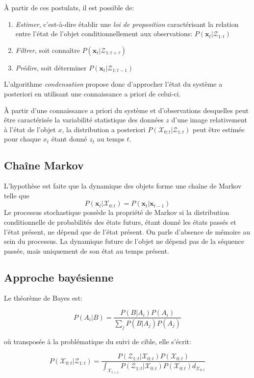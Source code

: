 \documentclass[a4paper,11pt]{report}
\begin{document}
À partir de ces postulats, il est possible de:
\begin{enumerate}
\item \textit{Estimer}, c'est-à-dire établir une \textit{loi de proposition} caractérisant la relation entre l'état de l'objet conditionnellement aux observations: $P(\mathbf{x}_t|\mathcal{Z}_{1:t})$
\item \textit{Filtrer}, soit connaître $P(\mathbf{x}_t|\mathcal{Z}_{1:t+\tau})$
\item \textit{Prédire}, soit déterminer $P(\mathbf{x}_t|\mathcal{Z}_{1:t-1})$\\
\end{enumerate}

L'algorithme \textit{condensation} propose donc d'approcher l'état du système a posteriori en utilisant une connaissance a priori de celui-ci.
 
À partir d'une connaissance a priori du système et d'observations desquelles peut être caractérisée la variabilité statistique des données $z$ d'une image relativement à l'état de l'objet $x$, la distribution a posteriori $P(\mathcal{X}_{0:t}|\mathcal{Z}_{1:t})$ peut être estimée pour chaque $x_t$ étant donné $z_t$ au temps $t$.\\

\subsection{Chaîne Markov}
L'hypothèse est faite que la dynamique des objets forme une chaîne de Markov telle que $$P(\mathbf{x}_{t}|\mathcal{X}_{0:t})=P(\mathbf{x}_t|\mathbf{x}_{t-1})$$
Le processus stochastique possède la propriété de Markov si la distribution conditionnelle de probabilités des états futurs, étant donné les états passés et l'état présent, ne dépend que de l'état présent. 
On parle d'absence de mémoire au sein du processus.
La dynamique future de l'objet ne dépend pas de la séquence passée, mais uniquement de son état au temps présent.


\subsection{Approche bayésienne}
Le théorème de Bayes est:

$$P(A_i|B) = \frac{P(B | A_i) P(A_i)}{\sum_j P(B|A_j)P(A_j)}$$

où transposée à la problématique du suivi de cible, elle s'écrit:

$$P(\mathcal{X}_{0:t}|\mathcal{Z}_{1:t}) =  \frac{P(\mathcal{Z}_{1:t}|\mathcal{X}_{0:t})P(\mathcal{X}_{0:t})}{\int_{\mathcal{X}_{t+1}}P(\mathcal{Z}_{1:t}|\mathcal{X}_{0:t})P(\mathcal{X}_{0:t})d_{\mathcal{X}_{0:t}}}$$\\
\end{document}
